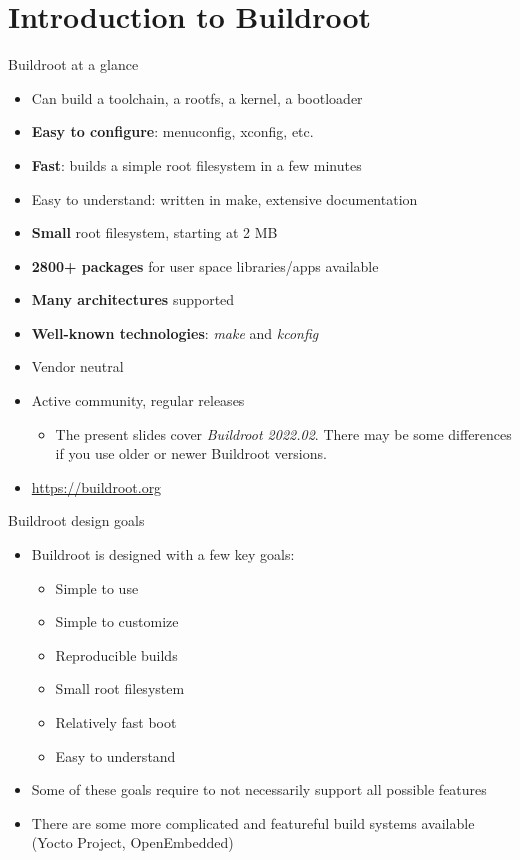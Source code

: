 \section{Introduction to Buildroot}

\begin{frame}{Buildroot at a glance}
  \begin{itemize}
  \item Can build a toolchain, a rootfs, a kernel, a bootloader
  \item {\bf Easy to configure}: menuconfig, xconfig, etc.
  \item {\bf Fast}: builds a simple root filesystem in a few minutes
  \item Easy to understand: written in make, extensive documentation
  \item {\bf Small} root filesystem, starting at 2 MB
  \item {\bf 2800+ packages} for user space libraries/apps available
  \item {\bf Many architectures} supported
  \item {\bf Well-known technologies}: {\em make} and {\em kconfig}
  \item Vendor neutral
  \item Active community, regular releases
    \begin{itemize}
    \item The present slides cover {\em Buildroot 2022.02}. There may
      be some differences if you use older or newer Buildroot versions.
    \end{itemize}
  \item \url{https://buildroot.org}
  \end{itemize}
\end{frame}

\begin{frame}{Buildroot design goals}
  \begin{itemize}
  \item Buildroot is designed with a few key goals:
    \begin{itemize}
    \item Simple to use
    \item Simple to customize
    \item Reproducible builds
    \item Small root filesystem
    \item Relatively fast boot
    \item Easy to understand
    \end{itemize}
  \item Some of these goals require to not necessarily support all
    possible features
  \item There are some more complicated and featureful build systems
    available (Yocto Project, OpenEmbedded)
  \end{itemize}
\end{frame}

